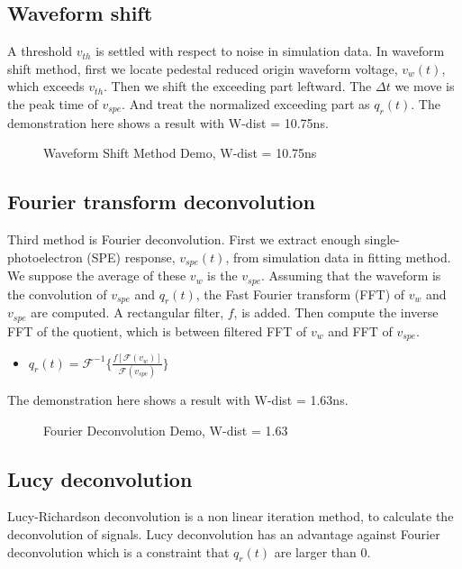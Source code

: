 \subsection{Waveform shift}
A threshold $v_{th}$ is settled with respect to noise in simulation data. In waveform shift method, first we locate pedestal reduced origin waveform voltage, $v_{w}(t)$, which exceeds $v_{th}$. Then we shift the exceeding part leftward. The $\Delta t$ we move is the peak time of $v_{spe}$. And treat the normalized exceeding part as $q_{r}(t)$. The demonstration here shows a result with W-dist = 10.75ns. 

\begin{figure}[H]
    \centering
    \scalebox{0.4}{}
    \caption{Waveform Shift Method Demo, W-dist = 10.75ns}
\end{figure}

\subsection{Fourier transform deconvolution}
Third method is Fourier deconvolution. First we extract enough single-photoelectron (SPE) response, $v_{spe}(t)$, from simulation data in fitting method. We suppose the average of these $v_{w}$ is the $v_{spe}$. Assuming that the waveform is the convolution of $v_{spe}$ and $q_{r}(t)$, the Fast Fourier transform (FFT) of $v_{w}$ and $v_{spe}$ are computed. A rectangular filter, $f$, is added. Then compute the inverse FFT of the quotient, which is between filtered FFT of $v_{w}$ and FFT of $v_{spe}$. 

\begin{itemize}
    \item $q_{r}(t) = \mathcal{F}^{-1}\{\frac{f[\mathcal{F}(v_{w})]}{\mathcal{F}(v_{spe})}\}$
\end{itemize}

The demonstration here shows a result with W-dist = 1.63ns. 

\begin{figure}[H]
    \centering
    \scalebox{0.4}{}
    \caption{Fourier Deconvolution Demo, W-dist = 1.63}
\end{figure}

\subsection{Lucy deconvolution}
Lucy-Richardson deconvolution is a non linear iteration method, to calculate the deconvolution of signals. Lucy deconvolution has an advantage against Fourier deconvolution which is a constraint that $q_{r}(t)$ are larger than 0. 

